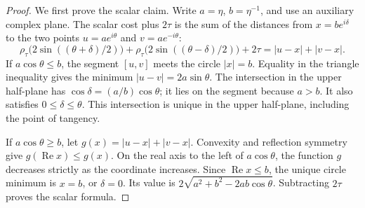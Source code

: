 \begin{proof}
We first prove the scalar claim. Write $a=\eta$, $b=\eta^{-1}$, and
use an auxiliary complex plane. The scalar cost plus
$2\tau$ is the sum of the distances from $x=be^{i\delta}$ to the two
points $u=ae^{i\theta}$ and $v=ae^{-i\theta}$:
\begin{equation}
 \rho_\tau\bigl(2\sin((\theta+\delta)/2)\bigr)
 +\rho_\tau\bigl(2\sin((\theta-\delta)/2)\bigr)+2\tau
 =|u-x|+|v-x|.
 \label{eq:smoothed-ellipse}
\end{equation}
If $a\cos\theta\leq b$, the segment $[u,v]$ meets the circle
$|x|=b$. Equality in the triangle inequality gives the minimum
$|u-v|=2a\sin\theta$. The intersection in the upper half-plane has
$\cos\delta=(a/b)\cos\theta$; it lies on the segment because $a>b$.
It also satisfies $0\leq\delta\leq\theta$. This intersection is unique
in the upper half-plane, including the point of tangency.

If $a\cos\theta\geq b$, let $g(x)=|u-x|+|v-x|$. Convexity and
reflection symmetry give $g(\operatorname{Re}x)\leq g(x)$. On the real
axis to the left of $a\cos\theta$, the function $g$ decreases strictly
as the coordinate increases. Since $\operatorname{Re}x\leq b$, the
unique circle minimum is $x=b$, or $\delta=0$. Its value is
$2\sqrt{a^2+b^2-2ab\cos\theta}$. Subtracting $2\tau$ proves the
scalar formula.


\end{proof}
